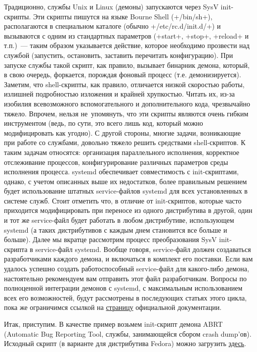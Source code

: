 \documentclass[10pt,oneside,a4paper]{article}
\begin{document}
Традиционно, службы Unix и Linux (демоны) запускаются через SysV init-скрипты.
Эти скрипты пишутся на языке Bourne Shell (+/bin/sh+), располагаются в
специальном каталоге (обычно +/etc/rc.d/init.d/+) и вызываются с одним из
стандартных параметров (+start+, +stop+, +reload+ и т.п.)~--- таким образом
указывается действие, которое необходимо прозвести над службой (запустить,
остановить, заставить перечитать конфигурацию). При запуске службы такой
скрипт, как правило, вызывает бинарник демона, который, в свою очередь,
форкается, порождая фоновый процесс (т.е. демонизируется). Заметим, что
shell-скрипты, как правило, отличается низкой скоростью работы, излишней
подробностью изложения и крайней хрупкостью. Читать их, из-за изобилия
всевозможного вспомогательного и дополнительного кода, чрезвычайно тяжело.
Впрочем, нельзя не~упомянуть, что эти скрипты являются очень гибким
инструментом (ведь, по сути, это всего лишь код, который можно модифицировать
как угодно). С другой стороны, многие задачи, возникающие при работе со
службами, довольно тяжело решить средствами shell-скриптов. К таким
задачам относятся: организация параллельного исполнения, корректное
отслеживание процессов, конфигурирование различных параметров среды исполнения
процесса. systemd обеспечивает совместимость с init-скриптами, однако, с учетом
описанных выше их недостатков, более правильным решением будет использование
штатных service-файлов systemd для всех установленных в системе служб. Стоит
отметить что, в отличие от init-скриптов, которые часто приходится
модифицировать при переносе из одного дистрибутива в другой, один и тот же
service-файл будет работать в любом дистрибутиве, использующем systemd (а таких
дистрибутивов с каждым днем становится все больше и больше).  Далее мы вкратце
рассмотрим процесс преобразования SysV init-скрипта в service-файл systemd.
Вообще говоря, service-файл должен создаваться разработчиками каждого демона, и
включаться в комплект его поставки. Если вам удалось успешно создать
работоспособный service-файл для какого-либо демона, настоятельно рекомендуем
вам отправить этот файл разработчикам. Вопросы по полноценной интеграции
демонов с systemd, с максимальным использованием всех его возможностей, будут
рассмотрены в последующих статьях этого цикла, пока же ограничимся ссылкой на 
\href{http://0pointer.de/public/systemd-man/daemon.html}{страницу} официальной
документации. 

Итак, приступим. В качестве пример возьмем init-скрипт демона ABRT (Automatic
Bug Reporting Tool, службы, занимающейся сбором crash dump'ов). Исходный
скрипт (в варианте для дистрибутива Fedora) можно загрузить
\href{http://0pointer.de/public/abrtd}{здесь}.
\end{document}
